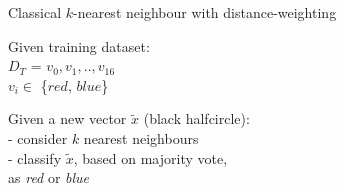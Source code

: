\documentclass[10pt]{beamer}
\begin{document}
{
\begin{frame}[fragile]{Classical $k$-nearest neighbour with distance-weighting}


\begin{minipage}[t]{.32\textwidth}
Given training dataset:\\
${D}_{T}$ = ${v}_{0}, {v}_{1},..,{v}_{16}$ \\
$v_{i} \in$ \{$red$, $blue$\}
\end{minipage}
\hspace{0.2cm}
\begin{minipage}[t]{.53\textwidth}
Given a new vector $\tilde{x}$ (black halfcircle):\\
- consider $k$ nearest neighbours\\
- classify $\tilde{x}$, based on majority vote,\\as \emph{red} or \emph{blue}
\end{minipage}


\end{frame}}
\end{document}
